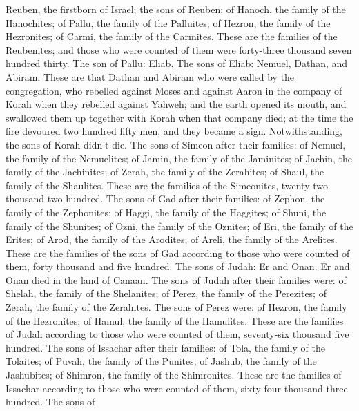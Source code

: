  Reuben, the firstborn of Israel; the sons of Reuben: of
Hanoch, the family of the Hanochites; of Pallu, the family of the
Palluites;  of Hezron, the family of the Hezronites; of
Carmi, the family of the Carmites.  These are the families
of the Reubenites; and those who were counted of them were forty-three
thousand seven hundred thirty.  The son of Pallu: Eliab.
 The sons of Eliab: Nemuel, Dathan, and Abiram. These are
that Dathan and Abiram who were called by the congregation, who rebelled
against Moses and against Aaron in the company of Korah when they
rebelled against Yahweh;  and the earth opened its mouth,
and swallowed them up together with Korah when that company died; at the
time the fire devoured two hundred fifty men, and they became a sign.
 Notwithstanding, the sons of Korah didn't die.
 The sons of Simeon after their families: of Nemuel, the
family of the Nemuelites; of Jamin, the family of the Jaminites; of
Jachin, the family of the Jachinites;  of Zerah, the
family of the Zerahites; of Shaul, the family of the Shaulites.
 These are the families of the Simeonites, twenty-two
thousand two hundred.  The sons of Gad after their
families: of Zephon, the family of the Zephonites; of Haggi, the family
of the Haggites; of Shuni, the family of the Shunites; 
of Ozni, the family of the Oznites; of Eri, the family of the Erites;
 of Arod, the family of the Arodites; of Areli, the
family of the Arelites.  These are the families of the
sons of Gad according to those who were counted of them, forty thousand
and five hundred.  The sons of Judah: Er and Onan. Er and
Onan died in the land of Canaan.  The sons of Judah after
their families were: of Shelah, the family of the Shelanites; of Perez,
the family of the Perezites; of Zerah, the family of the Zerahites.
 The sons of Perez were: of Hezron, the family of the
Hezronites; of Hamul, the family of the Hamulites.  These
are the families of Judah according to those who were counted of them,
seventy-six thousand five hundred.  The sons of Issachar
after their families: of Tola, the family of the Tolaites; of Puvah, the
family of the Punites;  of Jashub, the family of the
Jashubites; of Shimron, the family of the Shimronites. 
These are the families of Issachar according to those who were counted
of them, sixty-four thousand three hundred.  The sons of
